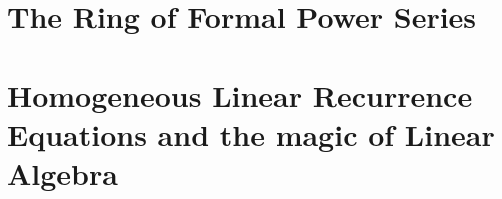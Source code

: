 




\section{The Ring of Formal Power Series}


\section{Homogeneous Linear Recurrence Equations and the magic of Linear Algebra}

